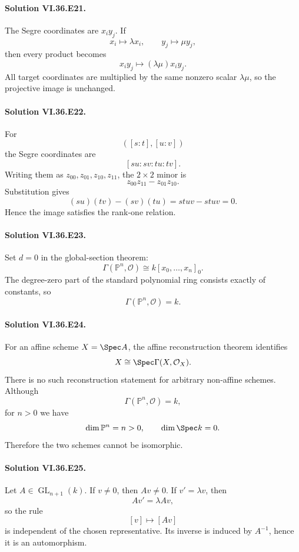 \paragraph{Solution VI.36.E21.}
The Segre coordinates are \(x_i y_j\). If
\[
x_i\mapsto\lambda x_i,
\qquad
y_j\mapsto\mu y_j,
\]
then every product becomes
\[
x_i y_j\mapsto(\lambda\mu)x_i y_j.
\]
All target coordinates are multiplied by the same nonzero scalar \(\lambda\mu\), so the projective image is
unchanged.

\paragraph{Solution VI.36.E22.}
For
\[
([s:t],[u:v])
\]
the Segre coordinates are
\[
[su:sv:tu:tv].
\]
Writing them as \(z_{00},z_{01},z_{10},z_{11}\), the \(2\times2\) minor is
\[
z_{00}z_{11}-z_{01}z_{10}.
\]
Substitution gives
\[
(su)(tv)-(sv)(tu)=stuv-stuv=0.
\]
Hence the image satisfies the rank-one relation.

\paragraph{Solution VI.36.E23.}
Set \(d=0\) in the global-section theorem:
\[
\Gamma(\mathbb P^n,\mathcal O)
\cong
k[x_0,\ldots,x_n]_0.
\]
The degree-zero part of the standard polynomial ring consists exactly of constants, so
\[
\boxed{\Gamma(\mathbb P^n,\mathcal O)=k}.
\]

\paragraph{Solution VI.36.E24.}
For an affine scheme \(X=\Spec A\), the affine reconstruction theorem identifies
\[
X\cong\Spec\Gamma(X,\mathcal O_X).
\]
There is no such reconstruction statement for arbitrary non-affine schemes. Although
\[
\Gamma(\mathbb P^n,\mathcal O)=k,
\]
for \(n>0\) we have
\[
\dim\mathbb P^n=n>0,
\qquad
\dim\Spec k=0.
\]
Therefore the two schemes cannot be isomorphic.

\paragraph{Solution VI.36.E25.}
Let \(A\in\operatorname{GL}_{n+1}(k)\). If \(v\neq0\), then \(Av\neq0\). If \(v'=\lambda v\), then
\[
Av'=\lambda Av,
\]
so the rule
\[
[v]\longmapsto[Av]
\]
is independent of the chosen representative. Its inverse is induced by \(A^{-1}\), hence it is an automorphism.

